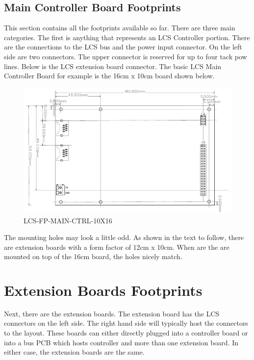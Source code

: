 \subsection{Main Controller Board Footprints}

This section contains all the footprints available so far. There are three main categories. The first is anything that represents an LCS Controller portion. There are the connections to the LCS bus and the power input connector. On the left side are two connectors. The upper connector is reserved for up to four tack pow lines. Below is the LCS extension board connector. The basic LCS Main Controller Board for example is the 16cm x 10cm board shown below.

\begin{figure}[htbp]
    \centering
    \includegraphics[page=1, scale=0.7]{./Figures/LCS-FP-MAIN-CTRL-10X16.pdf}
    \caption{LCS-FP-MAIN-CTRL-10X16}
\end{figure}

\FloatBarrier

The mounting holes may look a little odd. As shown in the text to follow, there are extension boards with a form factor of 12cm x 10cm. When are the are mounted on top of the 16cm board, the holes nicely match. 

\section{Extension Boards Footprints}

Next, there are the extension boards. The extension board has the LCS connectors on the left side. The right hand side will typically host the connectors to the layout. These boards can either directly plugged into a controller board or into a bus PCB which hosts controller and more than one extension board. In either case, the extension boards are the same.

